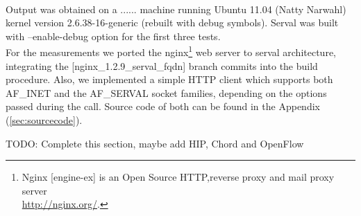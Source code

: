 \paragraph{} Output was obtained on a ...... machine running Ubuntu 11.04 (Natty Narwahl) kernel version 2.6.38-16-generic (rebuilt with debug symbols). Serval was built with --enable-debug option for the first three tests.\\
For the measurements we ported the nginx\footnote{Nginx [engine-ex] is an Open Source HTTP,reverse proxy and mail proxy server\\ \url{http://nginx.org/}.} web server to serval architecture, integrating the [nginx\_1.2.9\_serval\_fqdn] branch commits into the build procedure. Also, we implemented a simple HTTP client which supports both AF\_INET and the AF\_SERVAL socket families, depending on the options passed during the call. Source code of both can be found in the Appendix (\ref{sec:sourcecode}).


\iffalse
gprof
perf
google-profile tools
1) memory (oprofile)
2) CPU cycles (callgrind)
3) system calls time (strace)
4) timed execution of 1000 times
5) requests per second
6) Number of packers per request, bytes sent, packet structure
\fi

TODO: Complete this section, maybe add HIP, Chord and OpenFlow